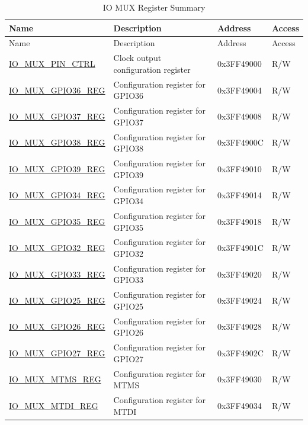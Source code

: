 \begin{longtable}{ | p{5cm} | p{7.5cm} | p{2cm} | p{1cm} | }
\caption{IO MUX Register Summary}\label{tab:iomux_reg_list_en}
\\\hline\rowcolor{lightgray}
Name & Description &  Address & Access \\ \hline
        \endfirsthead
        \hline
        \rowcolor{lightgray}
        Name & Description &  Address & Access \\
        \hline
        \endhead
        \endfoot
\hyperref[regdesc:IOMUXPINCTRL]{IO\_MUX\_PIN\_CTRL}&Clock output configuration register & 0x3FF49000 & R/W \\\hline
\hyperref[regdesc:IOMUXnREG]{IO\_MUX\_GPIO36\_REG} & Configuration register for GPIO36 & 0x3FF49004 & R/W \\ \hline
\hyperref[regdesc:IOMUXnREG]{IO\_MUX\_GPIO37\_REG} & Configuration register for GPIO37 & 0x3FF49008 & R/W \\ \hline
\hyperref[regdesc:IOMUXnREG]{IO\_MUX\_GPIO38\_REG} & Configuration register for GPIO38 & 0x3FF4900C & R/W \\ \hline
\hyperref[regdesc:IOMUXnREG]{IO\_MUX\_GPIO39\_REG} & Configuration register for GPIO39 & 0x3FF49010 & R/W \\ \hline
\hyperref[regdesc:IOMUXnREG]{IO\_MUX\_GPIO34\_REG} & Configuration register for GPIO34 & 0x3FF49014 & R/W \\ \hline
\hyperref[regdesc:IOMUXnREG]{IO\_MUX\_GPIO35\_REG} & Configuration register for GPIO35 & 0x3FF49018 & R/W \\ \hline
\hyperref[regdesc:IOMUXnREG]{IO\_MUX\_GPIO32\_REG} & Configuration register for GPIO32 & 0x3FF4901C & R/W \\ \hline
\hyperref[regdesc:IOMUXnREG]{IO\_MUX\_GPIO33\_REG} & Configuration register for GPIO33 & 0x3FF49020 & R/W \\ \hline
\hyperref[regdesc:IOMUXnREG]{IO\_MUX\_GPIO25\_REG} & Configuration register for GPIO25 & 0x3FF49024 & R/W \\ \hline
\hyperref[regdesc:IOMUXnREG]{IO\_MUX\_GPIO26\_REG} & Configuration register for GPIO26 & 0x3FF49028 & R/W \\ \hline
\hyperref[regdesc:IOMUXnREG]{IO\_MUX\_GPIO27\_REG} & Configuration register for GPIO27 & 0x3FF4902C & R/W \\ \hline
\hyperref[regdesc:IOMUXnREG]{IO\_MUX\_MTMS\_REG} & Configuration register for MTMS & 0x3FF49030 & R/W \\ \hline
\hyperref[regdesc:IOMUXnREG]{IO\_MUX\_MTDI\_REG} & Configuration register for MTDI & 0x3FF49034 & R/W \\ \hline

\end{longtable}
